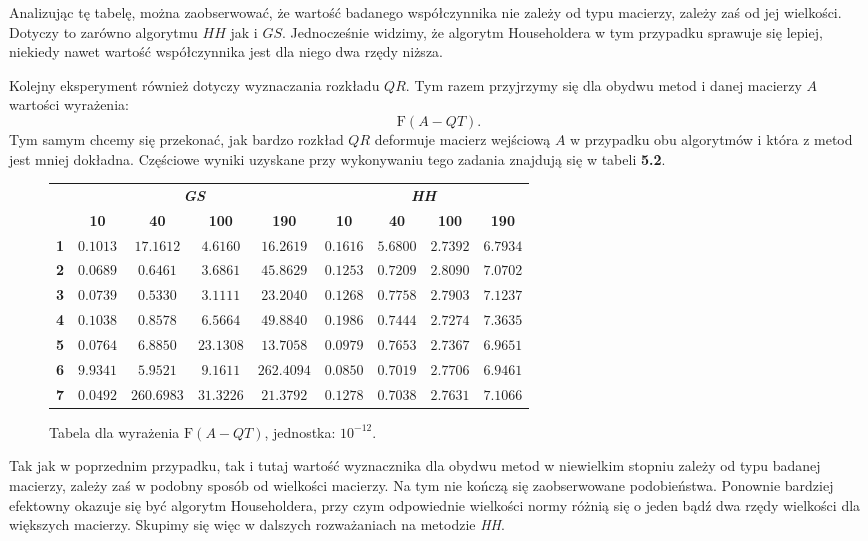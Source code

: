 Analizując tę tabelę, można zaobserwować, że wartość badanego współczynnika nie
zależy od typu macierzy, zależy
zaś od jej wielkości. Dotyczy to zarówno algorytmu $HH$ jak i $GS$.
Jednocześnie widzimy, że algorytm Householdera
w tym przypadku sprawuje się lepiej, niekiedy nawet wartość współczynnika jest
dla niego dwa rzędy niższa.

Kolejny eksperyment również dotyczy wyznaczania rozkładu $QR$. Tym razem
przyjrzymy się dla obydwu metod
i danej macierzy $A$ wartości wyrażenia:
$$\mathrm{F}(A-QT).$$
Tym samym chcemy się przekonać, jak bardzo rozkład $QR$ deformuje macierz
wejściową $A$ w przypadku obu algorytmów
i która z metod jest mniej dokładna. Częściowe wyniki uzyskane przy wykonywaniu
tego zadania znajdują się w tabeli
\textbf{5.2}.
\begin{figure}[h!tb]
\begin{center}
\begin{tabular}{|l||c|c|c|c||c|c|c|c|}
\hline
\multirow{2}{*}{} & \multicolumn{4}{|c||}{\textbf{\textit{GS}}} & \multicolumn{4}{|c|}{\textbf{\textit{HH}}}\\
\cline{2-9}
&\textbf{10} & \textbf{40} & \textbf{100} & \textbf{190} & \textbf{10} & \textbf{40} & \textbf{100} & \textbf{190} \\
\hline
\hline
\textbf{1} & $0.1013$ & $17.1612$ & $4.6160$ & $16.2619$ & $0.1616$ & $5.6800$ & $2.7392$ & $6.7934$ \\
\hline
\textbf{2} & $0.0689$ & $0.6461$ & $3.6861$ & $45.8629$ & $0.1253$ & $0.7209$ & $ 2.8090$ & $7.0702$ \\
\hline
\textbf{3} & $0.0739$ & $0.5330$ & $3.1111$ & $23.2040$ & $0.1268$ & $0.7758$ & $2.7903$ & $7.1237$ \\
\hline
\textbf{4} & $0.1038$ & $0.8578$ & $6.5664$ & $49.8840$ & $0.1986$ & $0.7444$ & $2.7274$ & $7.3635$ \\
\hline
\textbf{5} & $0.0764$ & $6.8850$ & $23.1308$ & $13.7058$ & $0.0979$ & $0.7653$ & $2.7367$ & $6.9651$ \\
\hline
\textbf{6} & $9.9341$ & $5.9521$ & $9.1611$ & $262.4094$ & $0.0850$ & $0.7019$ & $2.7706$ & $6.9461$ \\
\hline
\textbf{7} & $0.0492$ & $260.6983$ & $31.3226$ & $21.3792$ & $0.1278$ & $0.7038$ & $2.7631$ & $7.1066$ \\
\hline
\end{tabular}
\caption{Tabela dla wyrażenia $\mathrm{F}(A-QT)$, jednostka: $10^{-12}$.} 
\end{center}
\end{figure}
Tak jak w poprzednim przypadku, tak i tutaj wartość wyznacznika dla obydwu
metod w niewielkim stopniu
zależy od typu badanej macierzy, zależy zaś w podobny sposób od wielkości
macierzy. Na tym nie kończą
się zaobserwowane podobieństwa. Ponownie bardziej efektowny okazuje się być
algorytm Householdera, przy
czym odpowiednie wielkości normy różnią się o jeden bądź dwa rzędy wielkości
dla większych macierzy. Skupimy
się więc w dalszych rozważaniach na metodzie \textit{HH}.

